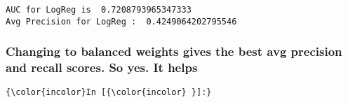 \documentclass[11pt]{article}
\begin{document}
    \begin{Verbatim}[commandchars=\\\{\}]
AUC for LogReg is  0.7208793965347333
Avg Precision for LogReg :  0.4249064202795546

    \end{Verbatim}

    \subsubsection{Changing to balanced weights gives the best avg precision
and recall scores. So yes. It
helps}\label{changing-to-balanced-weights-gives-the-best-avg-precision-and-recall-scores.-so-yes.-it-helps}

    \begin{Verbatim}[commandchars=\\\{\}]
{\color{incolor}In [{\color{incolor} }]:} 
\end{Verbatim}


    
    
    
    
\end{document}

